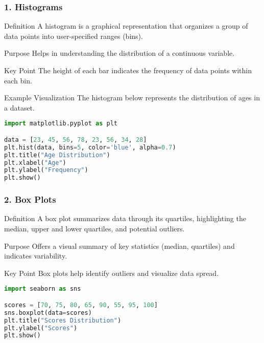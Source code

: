 \documentclass[aspectratio=169]{beamer}
\begin{document}
\begin{frame}[fragile]
    \frametitle{1. Histograms}
    \begin{block}{Definition}
        A histogram is a graphical representation that organizes a group of data points into user-specified ranges (bins).
    \end{block}
    \begin{block}{Purpose}
        Helps in understanding the distribution of a continuous variable.
    \end{block}
    \begin{block}{Key Point}
        The height of each bar indicates the frequency of data points within each bin.
    \end{block}
    \begin{block}{Example Visualization}
        The histogram below represents the distribution of ages in a dataset.
    \end{block}
    \begin{lstlisting}[language=Python]
import matplotlib.pyplot as plt

data = [23, 45, 56, 78, 23, 56, 34, 28]
plt.hist(data, bins=5, color='blue', alpha=0.7)
plt.title("Age Distribution")
plt.xlabel("Age")
plt.ylabel("Frequency")
plt.show()
    \end{lstlisting}
\end{frame}

\begin{frame}[fragile]
    \frametitle{2. Box Plots}
    \begin{block}{Definition}
        A box plot summarizes data through its quartiles, highlighting the median, upper and lower quartiles, and potential outliers.
    \end{block}
    \begin{block}{Purpose}
        Offers a visual summary of key statistics (median, quartiles) and indicates variability.
    \end{block}
    \begin{block}{Key Point}
        Box plots help identify outliers and visualize data spread.
    \end{block}
    \begin{lstlisting}[language=Python]
import seaborn as sns

scores = [70, 75, 80, 65, 90, 55, 95, 100]
sns.boxplot(data=scores)
plt.title("Scores Distribution")
plt.ylabel("Scores")
plt.show()
    \end{lstlisting}
\end{frame}
\end{document}
